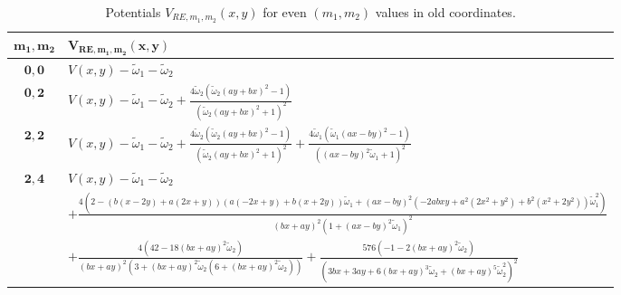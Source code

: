 \documentclass[a4paper, 12pt]{article}
\newcommand{\td}[1]{\tilde{#1}}
\begin{document}
\begin{table}[htp]%
  \centering
  \renewcommand{\arraystretch}{1.5} %
  \setlength{\tabcolsep}{1em} %
  \begin{tabularx}{\columnwidth}{|c|X|}
    \toprule
    $\mathbf{m_1,m_2}$ & $\mathbf{V_{RE,m_1,m_2}(x,y)}$ \\
    \toprule
    $\mathbf{0,0}$ &$ V(x,y)-\td{\omega}_1-\td{\omega}_2 $ \\
    \hline
    $\mathbf{0,2}$ &$V(x,y)-\td{\omega}_1-\td{\omega}_2+\frac{4 \td{\omega}_2 \left(\td{\omega}_2 (a y+b x)^2-1\right)}{\left(\td{\omega}_2 (a y+b x)^2+1\right)^2} $\\
    \hline
    $\mathbf{2,2}$ &$V(x,y)-\td{\omega}_1-\td{\omega}_2 +\frac{4 \td{\omega}_2 \left(\td{\omega}_2 (a y+b x)^2-1\right)}{\left(\td{\omega}_2 (a y+b x)^2+1\right)^2}+\frac{4 \td{\omega}_1 \left(\td{\omega}_1(a x - b y)^2 -1\right)}{\left((a x - b y)^2 \td{\omega}_1+1\right)^2}$ \\
    \hline
    $\mathbf{2,4}$ &$V(x,y)-\td{\omega}_1-\td{\omega}_2$\\
      & $+\frac{4 \left(2 - (b (x - 2 y) + a (2 x + y)) (a (-2 x + y) + b (x + 2 y)) \td{\omega}_1 + (a x - b y)^2 \left(-2 a b x y + a^2 (2 x^2 + y^2) + b^2 (x^2 + 2 y^2)\right) \td{\omega}_1^2\right)}{(b x + a y)^2 \left(1 + (a x - b y)^2 \td{\omega}_1\right)^2}$\\
      & $+\frac{4 \left(42 - 18 (b x + a y)^2 \td{\omega}_2\right)}{(b x + a y)^2 \left(3 + (b x + a y)^2 \td{\omega}_2 \left(6 + (b x + a y)^2 \td{\omega}_2\right)\right)}+\frac{576 \left(-1 - 2 (b x + a y)^2 \td{\omega}_2\right)}{\left(3 b x + 3 a y + 6 (b x + a y)^3 \td{\omega}_2 + (b x + a y)^5 \td{\omega}_2^2\right)^2}$\\
    \bottomrule
    \end{tabularx}  
    \caption{Potentials $V_{RE,m_1,m_2}(x,y)$ for even $(m_1,m_2)$ values in old coordinates.}
\label{Tab:2D-V-}
\end{table}
\end{document}

